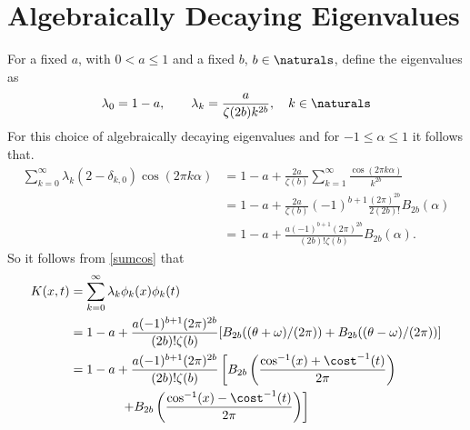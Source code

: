 \documentclass[]{elsarticle}
\theoremstyle{definition}
\begin{document}
\section{Algebraically Decaying Eigenvalues}
For a fixed $a$, with $0<a\le 1$ and a fixed $b$, $b \in \naturals$, define the eigenvalues as 
\begin{equation}
\lambda_0=1-a, \qquad \lambda_k = \frac{a}{\zeta(2b)k^{2b}}, \quad k \in \naturals
\end{equation}
For this choice of algebraically decaying eigenvalues and for $-1 \le \alpha \le 1$ it follows that.
\begin{align*}
\sum_{k=0}^{\infty} \lambda_k (2-\delta_{k,0}) \cos(2 \pi k\alpha)
&= 1-a + \frac{2a}{\zeta(b)}\sum_{k=1}^{\infty} \frac{\cos(2 \pi k\alpha)}{k^{2b}}\\
&= 1-a + \frac{2a}{\zeta(b)} (-1)^{b+1} \frac{(2 \pi)^{2b}} {2 (2b)!} B_{2b}(\alpha) \\
&= 1-a + \frac{a (-1)^{b+1}(2 \pi)^{2b}}{(2b)!\zeta(b)} B_{2b}(\alpha).
\end{align*}
So it follows from \eqref{sumcos} that
\begin{align*}
K(x,t) &= \sum_{k=0}^{\infty} \lambda_k \phi_k(x)\phi_k(t) \\
&= 1-a + \frac{a (-1)^{b+1}(2 \pi)^{2b}}{(2b)!\zeta(b)} [B_{2b}((\theta + \omega)/(2\pi)) + B_{2b}((\theta - \omega)/(2\pi))]\\
&= 1-a + \frac{a (-1)^{b+1}(2 \pi)^{2b}}{(2b)!\zeta(b)} \left[B_{2b}\left(\frac{\cos^{-1}(x) + \cost^{-1}(t)}{2\pi}\right) \right .  \\
& \qquad \qquad \left. + B_{2b}\left(\frac{\cos^{-1}(x) - \cost^{-1}(t)}{2\pi}\right) \right]
\end{align*}



\end{document}
